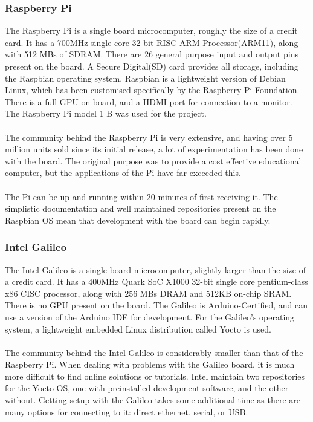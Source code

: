 \documentclass{article}
\begin{document}
\subsubsection{Raspberry Pi}
The Raspberry Pi is a single board microcomputer, roughly the size of a credit card. It has a 700MHz single core 32-bit RISC ARM Processor(ARM11), along with 512 MBs of SDRAM. There are 26 general purpose input and output pins present on the board. A Secure Digital(SD) card provides all storage, including the Raspbian operating system. Raspbian is a lightweight version of Debian Linux, which has been customised specifically by the Raspberry Pi Foundation. There is a full GPU on board, and a HDMI port for connection to a monitor. The Raspberry Pi model 1 B was used for the project. \\\\
The community behind the Raspberry Pi is very extensive, and having over 5 million units sold since its initial release, a lot of experimentation has been done with the board. The original purpose was to provide a cost effective educational computer, but the applications of the Pi have far exceeded this.\\\\
The Pi can be up and running within 20 minutes of first receiving it. The simplistic documentation and well maintained repositories present on the Raspbian OS mean that development with the board can begin rapidly. 
\subsubsection{Intel Galileo}
The Intel Galileo is a single board microcomputer, slightly larger than the size of a credit card. It has a 400MHz Quark SoC X1000 32-bit single core pentium-class x86 CISC processor, along with 256 MBs DRAM and 512KB on-chip SRAM. There is no GPU present on the board. The Galileo is Arduino-Certified, and can use a version of the Arduino IDE for development. For the Galileo\rq s operating system, a lightweight embedded Linux distribution called Yocto is used. \\\\
The community behind the Intel Galileo is considerably smaller than that of the Raspberry Pi. When dealing with problems with the Galileo board, it is much more difficult to find online solutions or tutorials. Intel maintain two repositories for the Yocto OS, one with preinstalled development software, and the other without. Getting setup with the Galileo takes some additional time as there are many options for connecting to it: direct ethernet, serial, or USB. 
\end{document}
